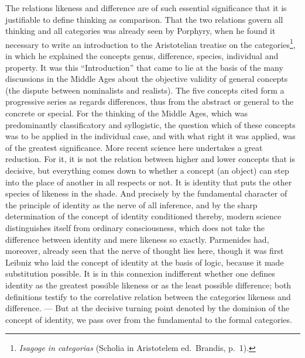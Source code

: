 \documentclass[12pt]{article}
\newcommand{\opage}[1]{\marginnote{\footnotesize\textit{[#1]}}}
\begin{document}
The relations likeness and difference are of such essential significance
that it is justifiable to define thinking as comparison. That the two
relations govern all thinking and all categories was already seen by
Porphyry, when he found it necessary to write an introduction to the
Aristotelian treatise on the categories\footnote{\textit{Isagoge in
categorias} (Scholia in Aristotelem ed.\ Brandis, p.~1).}, in which he
explained the concepts genus, difference, species, individual and property.
It was this ``Introduction'' that came to lie at the basis of the many
discussions in the Middle Ages about the objective validity of general
concepts (the dispute between nominalists and realists). The five concepts
cited form a progressive series as regards differences, thus from the
abstract or general to the concrete or special. For the thinking of the
Middle Ages, which was predominantly classificatory and syllogistic, the
question which of these \opage{33}concepts was to be applied in the individual case,
and with what right it was applied, was of the greatest significance. More
recent science here undertakes a great reduction. For it, it is not the
relation between higher and lower concepts that is decisive, but everything
comes down to whether a concept (an object) can step into the place of
another in all respects or not. It is identity that puts the other species
of likeness in the shade. And precisely by the fundamental character of the
principle of identity as the nerve of all inference, and by the sharp
determination of the concept of identity conditioned thereby, modern science
distinguishes itself from ordinary consciousness, which does not take the
difference between identity and mere likeness so exactly. Parmenides had,
moreover, already seen that the nerve of thought lies here, though it was
first Leibniz who laid the concept of identity at the basis of logic,
because it made substitution possible. It is in this connexion indifferent
whether one defines identity as the greatest possible likeness or as the
least possible difference; both definitions testify to the correlative
relation between the categories likeness and difference. --- But at the
decisive turning point denoted by the dominion of the concept of identity,
we pass over from the fundamental to the formal categories.
\end{document}
